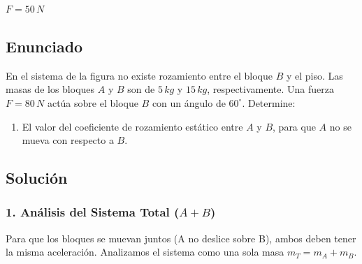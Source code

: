 \documentclass[12pt, a4paper]{article}
\begin{document}
\begin{tcolorbox}[colback=green!5!white, colframe=green!50!black, title=Respuesta Final]
\centering \Large $F = 50 \, \si{N}$
\end{tcolorbox}

\newpage

\subsection*{Enunciado}
En el sistema de la figura no existe rozamiento entre el bloque $B$ y el piso. Las masas de los bloques $A$ y $B$ son de $5 \, \si{kg}$ y $15 \, \si{kg}$, respectivamente. Una fuerza $F = 80 \, \si{N}$ actúa sobre el bloque $B$ con un ángulo de $60^\circ$. Determine:
\begin{enumerate}[label=\alph*)]
    \item El valor del coeficiente de rozamiento estático entre $A$ y $B$, para que $A$ no se mueva con respecto a $B$.
\end{enumerate}

\begin{center}
\end{center}

\subsection*{Solución}
\subsubsection*{1. Análisis del Sistema Total ($A+B$)}
Para que los bloques se muevan juntos (A no deslice sobre B), ambos deben tener la misma aceleración. Analizamos el sistema como una sola masa $m_T = m_A + m_B$.
\end{document}
